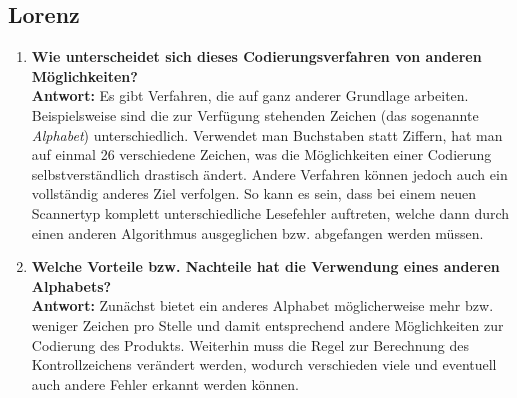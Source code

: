 \documentclass[a4paper,12pt]{article}
\begin{document}
\subsection{Lorenz}
\begin{enumerate}
\item{\textbf{Wie unterscheidet sich dieses Codierungsverfahren von anderen Möglichkeiten?}\\
  \textbf{Antwort:} Es gibt Verfahren, die auf ganz anderer Grundlage arbeiten. Beispielsweise sind die zur Verfügung stehenden Zeichen (das sogenannte \textit{Alphabet}) unterschiedlich. Verwendet man Buchstaben statt Ziffern, hat man auf einmal 26 verschiedene Zeichen, was die Möglichkeiten einer Codierung selbstverständlich drastisch ändert. Andere Verfahren können jedoch auch ein vollständig anderes Ziel verfolgen. So kann es sein, dass bei einem neuen Scannertyp komplett unterschiedliche Lesefehler auftreten, welche dann durch einen anderen Algorithmus ausgeglichen bzw. abgefangen werden müssen.}
\item{\textbf{Welche Vorteile bzw. Nachteile hat die Verwendung eines anderen Alphabets?}\\
  \textbf{Antwort:} Zunächst bietet ein anderes Alphabet möglicherweise mehr bzw. weniger Zeichen pro Stelle und damit entsprechend andere Möglichkeiten zur Codierung des Produkts. Weiterhin muss die Regel zur Berechnung des Kontrollzeichens verändert werden, wodurch verschieden viele und eventuell auch andere Fehler erkannt werden können.}
\end{enumerate}
\end{document}
